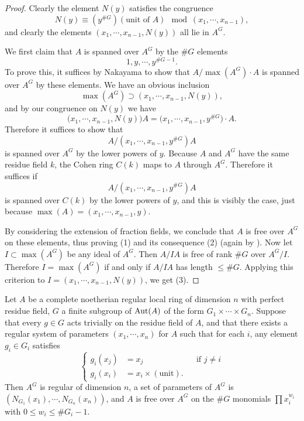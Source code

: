 \begin{proof}
Clearly the element $N(y)$ satisfies the congruence
\[
N(y) \equiv (y^{\#G})(\text{unit of } A) \mod (x_1,\cdots,x_{n-1}) ,
\]
and clearly the elements $(x_1,\cdots,x_{n-1},N(y))$ all lie in $A^G$.

We first claim that $A$ is spanned over $A^G$ by the $\#G$ elements
\[
1, y, \cdots, y^{\#G-1} .
\]
To prove this, it suffices by Nakayama to show that $A/\max(A^G) \cdot A$ is spanned over $A^G$ by these elements. We have an obvious inclusion
\[
\max(A^G) \supset (x_1,\cdots,x_{n-1},N(y)) ,
\]
and by our congruence on $N(y)$ we have
\[
\bigl(x_1,\cdots,x_{n-1},N(y)\bigr)A = \bigl(x_1,\cdots,x_{n-1},y^{\#G}\bigr) \cdot A .
\]
Therefore it suffices to show that
\[
A/(x_1,\cdots,x_{n-1},y^{\#G})A
\]
is spanned over $A^G$ by the lower powers of $y$. Because $A$ and $A^G$ have the same residue field $k$, the Cohen ring $C(k)$ maps to $A$ through $A^G$. Therefore it suffices if
\[
A/(x_1,\cdots,x_{n-1},y^{\#G})A
\]
is spanned over $C(k)$ by the lower powers of $y$, and this is visibly the case, just because $\max(A) = (x_1,\cdots,x_{n-1},y)$.

By considering the extension of fraction fields, we conclude that $A$ is free over $A^G$ on these elements, thus proving (1) and its consequence (2) (again by \cite[VII, 4.8]{AK1}). Now let $I \subset \max(A^G)$ be any ideal of $A^G$. Then $A/IA$ is free of rank $\#G$ over $A^G/I$. Therefore $I = \max(A^G)$ if and only if $A/IA$ has length $\leq \#G$. Applying this criterion to $I = (x_1,\cdots,x_{n-1},N(y))$, we get (3).
\end{proof}

\begin{kvar}\label{var:7.5.3}
Let $A$ be a complete noetherian regular local ring of dimension $n$ with perfect residue field, $G$ a finite subgroup of $\operatorname{Aut}(A)$ of the form $G_1 \times \cdots \times G_n$. Suppose that every $g \in G$ acts trivially on the residue field of $A$, and that there exists a regular system of parameters $(x_1,\cdots,x_n)$ for $A$ such that for each $i$, any element $g_i \in G_i$ satisfies
\[
\left\{
\begin{aligned}
g_i(x_j) &= x_j & & \text{if } j \neq i \\
g_i(x_i) &= x_i \times (\text{unit}) . & &
\end{aligned}
\right.
\]
Then $A^G$ is regular of dimension $n$, a set of parameters of $A^G$ is $(N_{G_1}(x_1),\cdots,N_{G_n}(x_n))$, and $A$ is free over $A^G$ on the $\#G$ monomials $\prod x_i^{w_i}$ with $0 \leq w_i \leq \#G_i - 1$.
\end{kvar}

